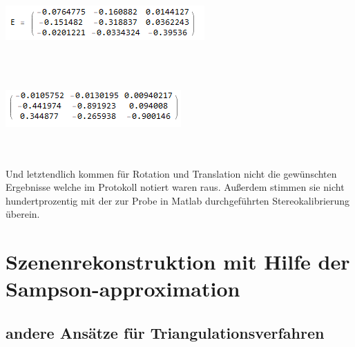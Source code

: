 \begin{minipage}{\linewidth}
	\centering
	\includegraphics[width=.4\linewidth]{images/E.png}
\end{minipage}\\\\

\begin{minipage}{\linewidth}
	\centering
	\includegraphics[width=.4\linewidth]{images/TestE.png}
\end{minipage}\\\\

Und letztendlich kommen für Rotation und Translation nicht die gewünschten Ergebnisse welche im Protokoll notiert waren raus. Außerdem stimmen sie nicht hundertprozentig mit der zur Probe in Matlab durchgeführten Stereokalibrierung überein.
\section{Szenenrekonstruktion mit Hilfe der Sampson-approximation}
\subsection{andere Ansätze für Triangulationsverfahren}



